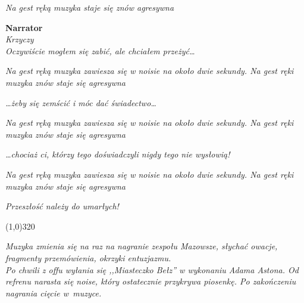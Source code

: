 \documentclass[11pt,a4paper,oneside]{article}
\begin{document}
{\color{light-gray} \emph{Na gest ręką muzyka staje się znów agresywna}}

\textbf{Narrator}\\
{\color{light-gray} \emph{Krzyczy}}\\
\emph{Oczywiście mogłem się zabić, ale chciałem przeżyć\dots{}} 

{\color{light-gray} \emph{Na gest ręką
muzyka zawiesza się w noisie na około dwie sekundy. Na gest ręki
muzyka znów staje się agresywna}}

\emph{\dots{}żeby się zemścić i móc dać świadectwo\dots{}}

{\color{light-gray} \emph{Na gest ręką
muzyka zawiesza się w noisie na około dwie sekundy. Na gest ręki
muzyka znów staje się agresywna}}

\emph{\dots{}chociaż ci, którzy tego doświadczyli nigdy tego nie wysłowią!}

{\color{light-gray} \emph{Na gest ręką
muzyka zawiesza się w noisie na około dwie sekundy. Na gest ręki
muzyka znów staje się agresywna}}

\emph{Przeszłość należy do umarłych!}

\line(1,0){320}

{\color{light-gray} \emph{Muzyka zmienia się na raz na nagranie
zespołu Mazowsze, słychać owacje, fragmenty przemówienia,
okrzyki entuzjazmu. \\ Po chwili z offu wyłania się ,,Miasteczko
Bełz'' w wykonaniu Adama Astona. Od refrenu narasta się noise,
który ostatecznie przykrywa piosenkę. Po zakończeniu nagrania
cięcie w~muzyce.}}
\end{document}
